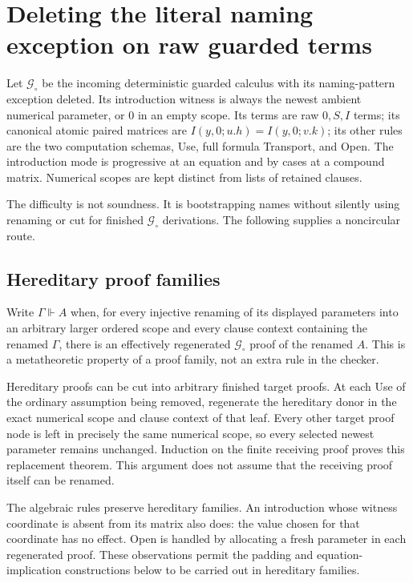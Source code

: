\section{Deleting the literal naming exception on raw guarded terms}
\label{sec:raw-guarded-bootstrap}

Let $\mathcal G_\circ$ be the incoming deterministic guarded calculus
with its naming-pattern exception deleted.  Its introduction witness is
always the newest ambient numerical parameter, or $0$ in an empty scope.
Its terms are raw $0,S,I$ terms; its canonical atomic paired matrices are
$I(y,0;u.h)=I(y,0;v.k)$; its other rules are the two computation schemas,
Use, full formula Transport, and Open.  The introduction mode is progressive
at an equation and by cases at a compound matrix.  Numerical scopes are
kept distinct from lists of retained clauses.

The difficulty is not soundness.  It is bootstrapping names without silently
using renaming or cut for finished $\mathcal G_\circ$ derivations.  The
following supplies a noncircular route.

\subsection{Hereditary proof families}

Write $\Gamma\Vdash A$ when, for every injective renaming of its displayed
parameters into an arbitrary larger ordered scope and every clause context
containing the renamed $\Gamma$, there is an effectively regenerated
$\mathcal G_\circ$ proof of the renamed $A$.  This is a metatheoretic
property of a proof family, not an extra rule in the checker.

Hereditary proofs can be cut into arbitrary finished target proofs.  At each
Use of the ordinary assumption being removed, regenerate the hereditary
donor in the exact numerical scope and clause context of that leaf.
Every other target proof node is left in precisely the same numerical scope,
so every selected newest parameter remains unchanged.  Induction on the
finite receiving proof proves this replacement theorem.  This argument
does not assume that the receiving proof itself can be renamed.

The algebraic rules preserve hereditary families.  An introduction whose
witness coordinate is absent from its matrix also does: the value chosen
for that coordinate has no effect.  Open is handled by allocating a fresh
parameter in each regenerated proof.  These observations permit the
padding and equation-implication constructions below to be carried out in
hereditary families.

